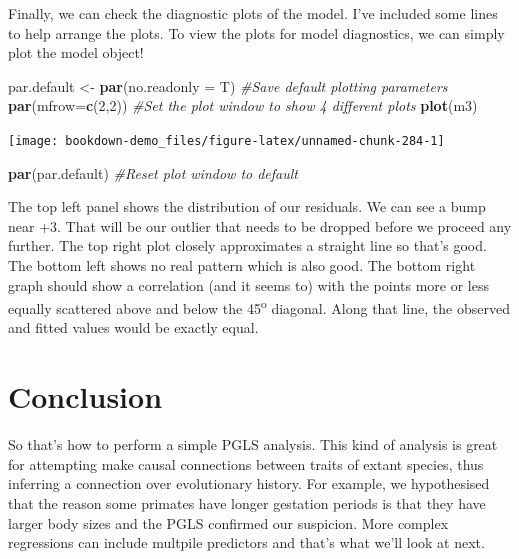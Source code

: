 \documentclass[
]{book}
\newenvironment{Shaded}{\begin{snugshade}}{\end{snugshade}}
\newcommand{\CommentTok}[1]{\textcolor[rgb]{0.56,0.35,0.01}{\textit{#1}}}
\newcommand{\DataTypeTok}[1]{\textcolor[rgb]{0.13,0.29,0.53}{#1}}
\newcommand{\DecValTok}[1]{\textcolor[rgb]{0.00,0.00,0.81}{#1}}
\newcommand{\KeywordTok}[1]{\textcolor[rgb]{0.13,0.29,0.53}{\textbf{#1}}}
\newcommand{\NormalTok}[1]{#1}
\newcommand{\StringTok}[1]{\textcolor[rgb]{0.31,0.60,0.02}{#1}}
\begin{document}
Finally, we can check the diagnostic plots of the model. I've included some lines to help arrange the plots. To view the plots for model diagnostics, we can simply plot the model object!

\begin{Shaded}
\begin{Highlighting}[]
\NormalTok{par.default \textless{}{-}}\StringTok{ }\KeywordTok{par}\NormalTok{(}\DataTypeTok{no.readonly =}\NormalTok{ T) }\CommentTok{\#Save default plotting parameters}
\KeywordTok{par}\NormalTok{(}\DataTypeTok{mfrow=}\KeywordTok{c}\NormalTok{(}\DecValTok{2}\NormalTok{,}\DecValTok{2}\NormalTok{)) }\CommentTok{\#Set the plot window to show 4 different plots}
\KeywordTok{plot}\NormalTok{(m3)}
\end{Highlighting}
\end{Shaded}

\begin{center}\texttt{[image: bookdown-demo\_files/figure-latex/unnamed-chunk-284-1]} \end{center}

\begin{Shaded}
\begin{Highlighting}[]
\KeywordTok{par}\NormalTok{(par.default) }\CommentTok{\#Reset plot window to default}
\end{Highlighting}
\end{Shaded}

The top left panel shows the distribution of our residuals. We can see a bump near +3. That will be our outlier that needs to be dropped before we proceed any further. The top right plot closely approximates a straight line so that's good. The bottom left shows no real pattern which is also good. The bottom right graph should show a correlation (and it seems to) with the points more or less equally scattered above and below the 45\textsuperscript{o} diagonal. Along that line, the observed and fitted values would be exactly equal.

\hypertarget{conclusion}{%
\section{Conclusion}\label{conclusion}}

So that's how to perform a simple PGLS analysis. This kind of analysis is great for attempting make causal connections between traits of extant species, thus inferring a connection over evolutionary history. For example, we hypothesised that the reason some primates have longer gestation periods is that they have larger body sizes and the PGLS confirmed our suspicion. More complex regressions can include multpile predictors and that's what we'll look at next.
\end{document}
